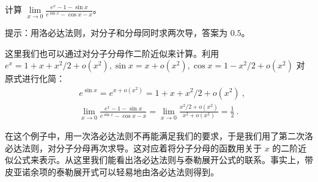 \begin{exercise}{}
计算 $\lim\limits_{x\rightarrow 0}\frac{e^x-1-\sin x}{e^{\sin x} - \cos x - x}$。
\end{exercise}
提示：用洛必达法则，对分子和分母同时求两次导，答案为 $0.5$。

这里我们也可以通过对分子分母作二阶近似来计算。利用 $e^x=1+x+x^2/2+o(x^2),\sin x=x+o(x^2),\cos x=1-x^2/2+o(x^2)$ 对原式进行化简：
\begin{equation}
\begin{aligned}
&e^{\sin x}=e^{x+o(x^2)}=1+x+x^2/2+o(x^2)~,\\
&\lim\limits_{x\rightarrow 0}\frac{e^x-1-\sin x}{e^{\sin x} - \cos x - x}=\lim\limits_{x\rightarrow 0}\frac{x^2/2+o(x^2)}{x^2+o(x^2)}=\frac{1}{2}~.
\end{aligned}
\end{equation}

在这个例子中，用一次洛必达法则不再能满足我们的要求，于是我们用了第二次洛必达法则，对分子分母再次求导。这对应着将分子分母的函数用关于 $x$ 的二阶近似公式来表示。从这里我们能看出洛必达法则与泰勒展开公式的联系。事实上，带皮亚诺余项的泰勒展开式可以轻易地由洛必达法则得到。
